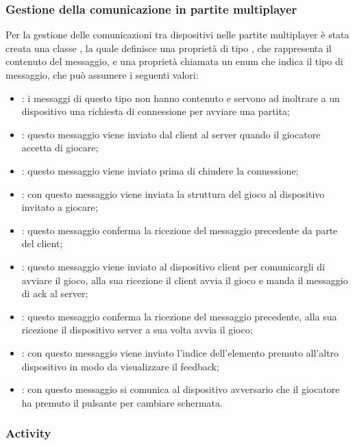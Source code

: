 \subsubsection{Gestione della comunicazione in partite multiplayer}
\noindent Per la gestione delle comunicazioni tra dispositivi nelle partite multiplayer \`{e} stata creata una classe , la quale definisce una propriet\`{a} di tipo , che rappresenta il contenuto del messaggio, e una propriet\`{a} chiamata  un enum che indica il tipo di messaggio, che pu\`{o} assumere i seguenti valori:
\begin{itemize}
\item {}: i messaggi di questo tipo non hanno contenuto e servono ad inoltrare a un dispositivo una richiesta di connessione per avviare una partita;
\item {}: questo messaggio viene inviato dal client al server quando il giocatore accetta di giocare;
\item {}: questo messaggio viene inviato prima di chiudere la connessione;
\item {}: con questo messaggio viene inviata la struttura del gioco al dispositivo invitato a giocare;
\item {}: questo messaggio conferma la ricezione del messaggio precedente da parte del client;
\item {}: questo messaggio viene inviato al dispositivo client per comunicargli di avviare il gioco, alla sua ricezione il client avvia il gioco e manda il messaggio di ack al server;
\item {}: questo messaggio conferma la ricezione del messaggio precedente, alla sua ricezione il dispositivo server a sua volta avvia il gioco;
\item {}: con questo messaggio viene inviato l'indice dell'elemento premuto all'altro dispositivo in modo da visualizzare il feedback;
\item {}: con questo messaggio si comunica al dispositivo avversario che il giocatore ha premuto il pulsante per cambiare schermata.
\end{itemize}

\subsubsection{Activity}

